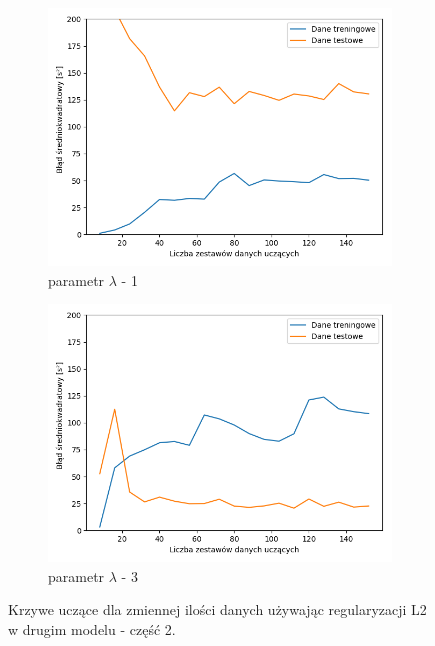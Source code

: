 \documentclass[12pt]{aghdpl}
\begin{document}
		\begin{figure}[h]
			\centering
		 	\begin{subfigure}{.8\linewidth}
		 		\includegraphics[width =\linewidth]{wykresy/6_regularyzacja/l2/regularyzacja_1_learning_curves.png}
		 		\caption{parametr $\lambda$ - 1}
		 	\end{subfigure}
		 	\begin{subfigure}{.8\linewidth}
		 		\includegraphics[width =\linewidth]{wykresy/6_regularyzacja/l2/regularyzacja_3_learning_curves.png}
		 		\caption{parametr $\lambda$ - 3}
		 	\end{subfigure}
	 	
 			\caption{Krzywe uczące dla zmiennej ilości danych używając regularyzacji L2 w drugim modelu - część 2.}
			\label{fig: drugi_model_przy_regularyzacji_l2_learning_curves_2}
		\end{figure}
		
\end{document}
